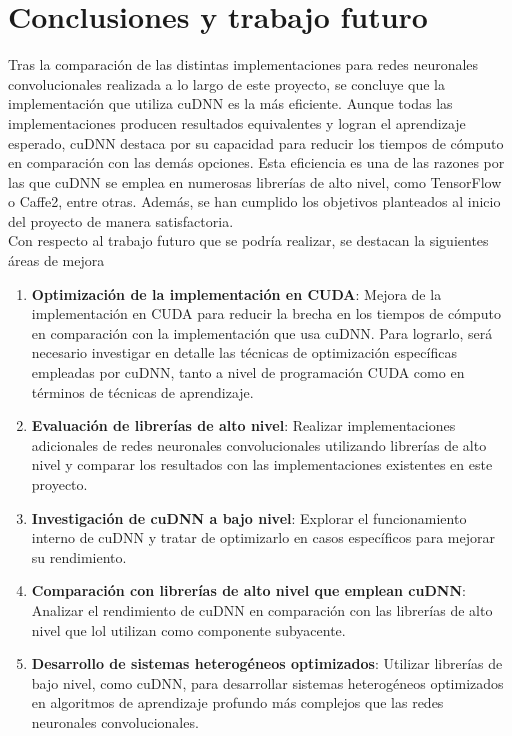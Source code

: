 \chapter{Conclusiones y trabajo futuro}

Tras la comparación de las distintas implementaciones para redes neuronales convolucionales realizada a lo largo de este proyecto, se concluye que la implementación que utiliza cuDNN es la más eficiente. Aunque todas las implementaciones producen resultados equivalentes y logran el aprendizaje esperado, cuDNN destaca por su capacidad para reducir los tiempos de cómputo en comparación con las demás opciones. Esta eficiencia es una de las razones por las que cuDNN se emplea en numerosas librerías de alto nivel, como TensorFlow o Caffe2, entre otras. Además, se han cumplido los objetivos planteados al inicio del proyecto de manera satisfactoria. \\
Con respecto al trabajo futuro que se podría realizar, se destacan la siguientes áreas de mejora
\begin{enumerate}[label=\textbullet]
	\item \textbf{Optimización de la implementación en CUDA}: Mejora de la implementación en CUDA para reducir la brecha en los tiempos de cómputo en comparación con la implementación que usa cuDNN. Para lograrlo, será necesario investigar en detalle las técnicas de optimización específicas empleadas por cuDNN, tanto a nivel de programación CUDA como en términos de técnicas de aprendizaje.
	\item \textbf{Evaluación de librerías de alto nivel}: Realizar implementaciones adicionales de redes neuronales convolucionales utilizando librerías de alto nivel y comparar los resultados con las implementaciones existentes en este proyecto.
	\item \textbf{Investigación de cuDNN a bajo nivel}: Explorar el funcionamiento interno de cuDNN y tratar de optimizarlo en casos específicos para mejorar su rendimiento.
	\item \textbf{Comparación con librerías de alto nivel que emplean cuDNN}: Analizar el rendimiento de cuDNN en comparación con las librerías de alto nivel que lol utilizan como componente subyacente.
	\item \textbf{Desarrollo de sistemas heterogéneos optimizados}: Utilizar librerías de bajo nivel, como cuDNN, para desarrollar sistemas heterogéneos optimizados en algoritmos de aprendizaje profundo más complejos que las redes neuronales convolucionales.  
\end{enumerate}